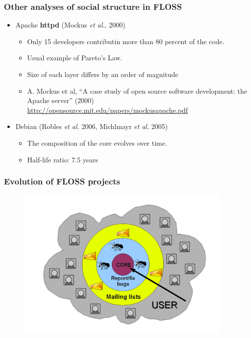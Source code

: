 \documentclass{beamer}
\begin{document}
\begin{frame}
 \frametitle{Other analyses of social structure in FLOSS}
 \begin{itemize}
  \item Apache \textbf{httpd} (Mockus \emph{et al.}, 2000)
  \begin{itemize}
   \item Only 15 developers contributin more than 80 percent
   of the code.
   \item Usual example of Pareto's Law.
   \item Size of each layer differs by an order of magnitude
    \item \begin{footnotesize}[Mockus 2000] A. Mockus et al, ``A case study of open source software development:
      the Apache server'' (2000)
      \url{http://opensource.mit.edu/papers/mockusapache.pdf}\end{footnotesize}
  \end{itemize}
  \item Debian (Robles \emph{et al.} 2006, Michlmayr \emph{et al.} 2005)
  \begin{itemize}
   \item The composition of the core evolves over time.
   \item Half-life ratio: 7.5 years
  \end{itemize}
 \end{itemize}
\end{frame}


\begin{frame}
\frametitle{Evolution of FLOSS projects}
\begin{center}
\begin{figure}
 \includegraphics[height=7.5cm]{figs/progression.png}
\end{figure}
\end{center}
\end{frame}
\end{document}

